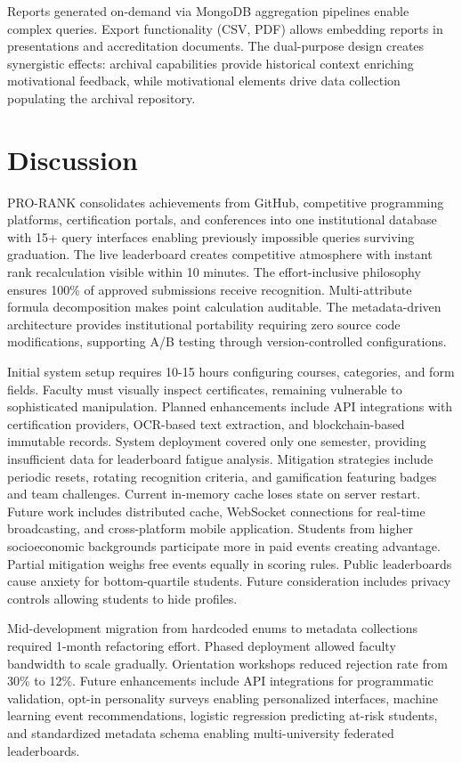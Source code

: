 \documentclass[conference]{IEEEtran}
\begin{document}
Reports generated on-demand via MongoDB aggregation pipelines enable complex queries. Export functionality (CSV, PDF) allows embedding reports in presentations and accreditation documents. The dual-purpose design creates synergistic effects: archival capabilities provide historical context enriching motivational feedback, while motivational elements drive data collection populating the archival repository.


\section{Discussion}

PRO-RANK consolidates achievements from GitHub, competitive programming platforms, certification portals, and conferences into one institutional database with 15+ query interfaces enabling previously impossible queries surviving graduation. The live leaderboard creates competitive atmosphere with instant rank recalculation visible within 10 minutes. The effort-inclusive philosophy ensures 100\% of approved submissions receive recognition. Multi-attribute formula decomposition makes point calculation auditable. The metadata-driven architecture provides institutional portability requiring zero source code modifications, supporting A/B testing through version-controlled configurations.

Initial system setup requires 10-15 hours configuring courses, categories, and form fields. Faculty must visually inspect certificates, remaining vulnerable to sophisticated manipulation. Planned enhancements include API integrations with certification providers, OCR-based text extraction, and blockchain-based immutable records. System deployment covered only one semester, providing insufficient data for leaderboard fatigue analysis. Mitigation strategies include periodic resets, rotating recognition criteria, and gamification featuring badges and team challenges. Current in-memory cache loses state on server restart. Future work includes distributed cache, WebSocket connections for real-time broadcasting, and cross-platform mobile application. Students from higher socioeconomic backgrounds participate more in paid events creating advantage. Partial mitigation weighs free events equally in scoring rules. Public leaderboards cause anxiety for bottom-quartile students. Future consideration includes privacy controls allowing students to hide profiles.

Mid-development migration from hardcoded enums to metadata collections required 1-month refactoring effort. Phased deployment allowed faculty bandwidth to scale gradually. Orientation workshops reduced rejection rate from 30\% to 12\%. Future enhancements include API integrations for programmatic validation, opt-in personality surveys enabling personalized interfaces, machine learning event recommendations, logistic regression predicting at-risk students, and standardized metadata schema enabling multi-university federated leaderboards.
\end{document}
